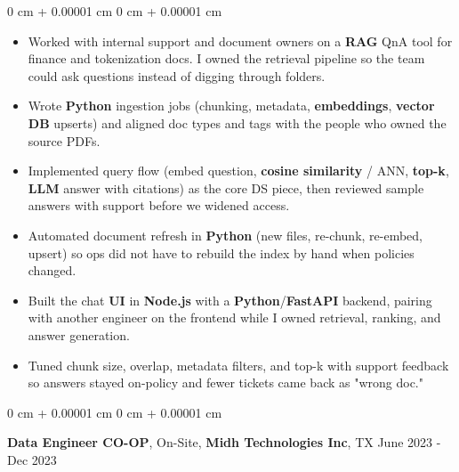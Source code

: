 \documentclass[10pt, letterpaper]{article}
\newenvironment{highlights}{
    \begin{itemize}[
        topsep=0.10 cm,
        parsep=0.10 cm,
        partopsep=0pt,
        itemsep=0pt,
        leftmargin=0 cm + 10pt
    ]
}{
    \end{itemize}
} %
\newenvironment{onecolentry}{
    \begin{adjustwidth}{
        0 cm + 0.00001 cm
    }{
        0 cm + 0.00001 cm
    }
}{
    \end{adjustwidth}
} %
\newcommand{\resumeheading}[2]{%
    \begin{onecolentry}
        #1 \hfill #2
    \end{onecolentry}
} %
\begin{document}
\begin{onecolentry}
\begin{highlights}
	\item Worked with internal support and document owners on a \textbf{RAG} QnA tool for finance and tokenization docs. I owned the retrieval pipeline so the team could ask questions instead of digging through folders.
	\item Wrote \textbf{Python} ingestion jobs (chunking, metadata, \textbf{embeddings}, \textbf{vector DB} upserts) and aligned doc types and tags with the people who owned the source PDFs.
	\item Implemented query flow (embed question, \textbf{cosine similarity} / ANN, \textbf{top-k}, \textbf{LLM} answer with citations) as the core DS piece, then reviewed sample answers with support before we widened access.
	\item Automated document refresh in \textbf{Python} (new files, re-chunk, re-embed, upsert) so ops did not have to rebuild the index by hand when policies changed.
	\item Built the chat \textbf{UI} in \textbf{Node.js} with a \textbf{Python}/\textbf{FastAPI} backend, pairing with another engineer on the frontend while I owned retrieval, ranking, and answer generation.
	\item Tuned chunk size, overlap, metadata filters, and top-k with support feedback so answers stayed on-policy and fewer tickets came back as "wrong doc."
\end{highlights}
\end{onecolentry}



\vspace{0.15 cm}
\resumeheading{\textbf{Data Engineer CO-OP}, On-Site, \textbf{Midh Technologies Inc}, TX}{June 2023 - Dec 2023}
\end{document}
